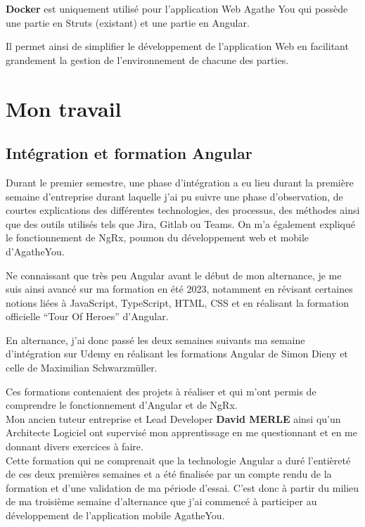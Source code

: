 \documentclass{article}
\begin{document}
\textbf{Docker} est uniquement utilisé pour l'application Web Agathe You qui possède une partie en Struts (existant) et une partie en Angular.

Il permet ainsi de simplifier le développement de l'application Web en facilitant grandement la gestion de l'environnement de chacune des parties.

\newpage

\section{Mon travail}

\subsection{Intégration et formation Angular}

Durant le premier semestre, une phase d'intégration a eu lieu durant la première semaine d'entreprise durant laquelle j'ai pu suivre une phase d'observation, de courtes explications des différentes technologies, des processus, des méthodes ainsi que des outils utilisés tels que Jira, Gitlab ou Teams. On m'a également expliqué le fonctionnement de NgRx, poumon du développement web et mobile d'AgatheYou.

Ne connaissant que très peu Angular avant le début de mon alternance, je me suis ainsi avancé sur ma formation en été 2023, notamment en révisant certaines notions liées à JavaScript, TypeScript, HTML, CSS et en réalisant la formation officielle “Tour Of Heroes” d'Angular.

En alternance, j'ai donc passé les deux semaines suivants ma semaine d'intégration sur Udemy en réalisant les formations Angular de Simon Dieny et celle de Maximilian Schwarzmüller.

Ces formations contenaient des projets à réaliser et qui m'ont permis de comprendre le fonctionnement d'Angular et de NgRx. \\

Mon ancien tuteur entreprise et Lead Developer \textbf{David MERLE} ainsi qu'un Architecte Logiciel ont supervisé mon apprentissage en me questionnant et en me donnant divers exercices à faire. \\

Cette formation qui ne comprenait que la technologie Angular a duré l'entièreté de ces deux premières semaines et a été finalisée par un compte rendu de la formation et d'une validation de ma période d'essai. C'est donc à partir du milieu de ma troisième semaine d'alternance que j'ai commencé à participer au développement de l'application mobile AgatheYou.
\end{document}
